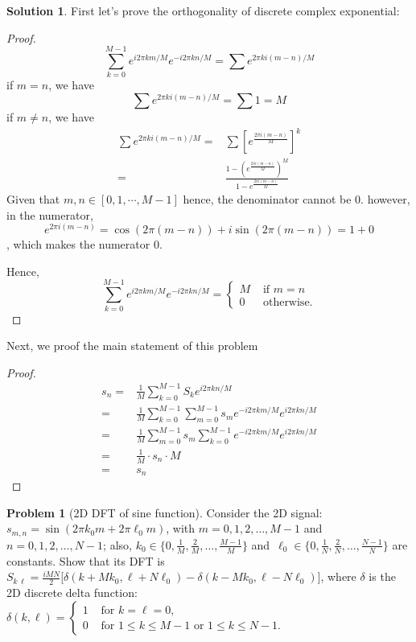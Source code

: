 \documentclass[11pt]{article}
\theoremstyle{plain}
\theoremstyle{definition}
\newtheorem{problem}{Problem}
\newtheorem{solution}{Solution}
\theoremstyle{remark}
\begin{document}
\begin{solution}
	First let's prove the orthogonality of discrete complex exponential:
	\begin{proof}
		\begin{equation*}
			\sum_{k=0}^{M-1} e^{i2\pi km/M}e^{-i2\pi kn/M} = \sum  e^{2\pi ki(m-n)/M}
		\end{equation*}
		if $m=n$, we have 
		$$ \sum  e^{2\pi ki(m-n)/M}= \sum 1 =M$$
		if $m\neq n$, we have
		\begin{eqnarray*}
			 \sum  e^{2\pi ki(m-n)/M} = & \sum [e^{\frac{2\pi i(m-n)}{M}}]^k\\
			 =& \frac{1-(e^{\frac{2\pi i (m-n)}{M}})^M}{1 - e^{\frac{2\pi i (m-n)}{M}}}
		\end{eqnarray*}
		Given that $m, n \in [0, 1, \cdots, M-1]$ hence, the denominator cannot be 0. however, in the numerator, 
		$$e^{2\pi i(m-n)} = \cos(2\pi(m-n)) + i\sin(2\pi(m-n)) = 1 + 0$$, which makes the numerator $0$.
		
		Hence, 
		$$
		\sum_{k=0}^{M-1}e^{i2\pi km/M}e^{-i2\pi kn/M} = \left\lbrace 
		\begin{array}{ll}
M&\mbox{ if }m=n\\
0 &\mbox{ otherwise}.
\end{array}
		\right.
		$$
	\end{proof}
	
	Next, we proof the main statement of this problem
	\begin{proof}
		\begin{eqnarray*}
			s_n =& \frac{1}{M} \sum	_{k=0}^{M-1} S_k e^{i2\pi kn/M}\\
			=&  \frac{1}{M} \sum	_{k=0}^{M-1} \sum_{m=0}^{M-1} s_m e^{-i 2\pi km/M} e^{i2\pi kn/M}\\
			=&  \frac{1}{M} \sum	_{m=0}^{M-1} s_m  \sum_{k=0}^{M-1}  e^{-i 2\pi km/M} e^{i2\pi kn/M}\\
			=& \frac{1}{M} \cdot s_n \cdot M\\
			=& s_n
		\end{eqnarray*}
	\end{proof}
\end{solution}
\begin{problem}[2D DFT of sine function]
	Consider the 2D signal:
	$s_{m,n}=\sin(2\pi k_0m+2\pi \ell_0m)$,
	with $m=0,1,2,\ldots,M-1$
	and $n=0,1,2,\ldots,N-1$;
	also, $k_0\in\big\{0,\frac{1}{M},\frac{2}{M},\ldots,
	\frac{M-1}{M}\big\}$ and~$\ell_0\in\big\{0,\frac{1}{N},\frac{2}{N},\ldots,
	\frac{N-1}{N}\big\}$
	are constants. 
	Show that its DFT
	is 
	$S_{k\,\ell}=\frac{iMN}{2}\big[\delta(k+Mk_0,\ell+N\ell_0)
	-\delta(k-Mk_0,\ell-N\ell_0)\big]$,
	where $\delta$
	is the 2D discrete delta function:
	$
	\delta(k,\ell)
	=\left\{
	\begin{array}{ll}
	1 & \mbox{ for }k=\ell=0, \\
	0 & \mbox{ for }1\leq k\leq M-1\mbox{ or }1\leq k\leq N-1. 
	\end{array}
	\right.
	$ 	 
\end{problem}
\end{document}
